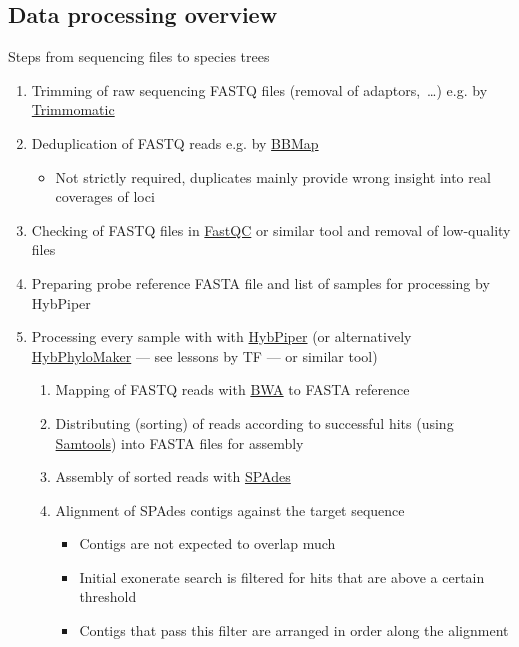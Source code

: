 \documentclass[compress,  xelatex, 11pt, xcolor=x11names, aspectratio=169,
	hyperref={
		bookmarks=true,
		unicode=true,
		colorlinks=true,
		pdftitle={HybSeq course},
		plainpages=false,
		pdfauthor={Vojtech Zeisek},
		pdfsubject={Practical processing of HybSeq target enrichment sequencing data on computing grids like MetaCentrum},
		pdfcreator={XeLaTeX},
		pdfkeywords={BASH, command line, GNU, HybSeq, Linux, MetaCentrum, sequencing shell, target enrichment},
		linkcolor=Turquoise4, %
		anchorcolor=DodgerBlue4, %
		citecolor=DodgerBlue4, %
		filecolor=DodgerBlue4, %
		menucolor=Tan4, %
		urlcolor=DarkOliveGreen4 %
		},
	url={hyphens, lowtilde} %
	]{beamer}
\begin{document}
\subsection{Data processing overview}

\begin{frame}[allowframebreaks]{Steps from sequencing files to species trees}
	\begin{enumerate}
		\item Trimming of raw sequencing FASTQ files (removal of adaptors,~\ldots) e.g. by \href{http://www.usadellab.org/cms/?page=trimmomatic}{Trimmomatic}
		\item Deduplication of FASTQ reads e.g. by \href{https://sourceforge.net/projects/bbmap/}{BBMap}
		\begin{itemize}
			\item Not strictly required, duplicates mainly provide wrong insight into real coverages of loci
		\end{itemize}
		\item Checking of FASTQ files in \href{https://www.bioinformatics.babraham.ac.uk/projects/fastqc/}{FastQC} or similar tool and removal of low-quality files
		\item Preparing probe reference FASTA file and list of samples for processing by HybPiper
		\item Processing every sample with with \href{https://github.com/mossmatters/HybPiper/wiki}{HybPiper} (or alternatively \href{https://github.com/tomas-fer/HybPhyloMaker}{HybPhyloMaker} --- see lessons by TF --- or similar tool)
		\begin{enumerate}
			\item Mapping of FASTQ reads with \href{https://github.com/lh3/bwa}{BWA} to FASTA reference
			\item Distributing (sorting) of reads according to successful hits (using \href{https://www.htslib.org/}{Samtools}) into FASTA files for assembly
			\item Assembly of sorted reads with \href{https://github.com/ablab/spades}{SPAdes}
			\item Alignment of SPAdes contigs against the target sequence
			\begin{itemize}
				\item Contigs are not expected to overlap much
				\item Initial exonerate search is filtered for hits that are above a certain threshold
				\item Contigs that pass this filter are arranged in order along the alignment

\end{itemize}
\end{enumerate}
\end{enumerate}
\end{frame}
\end{document}
